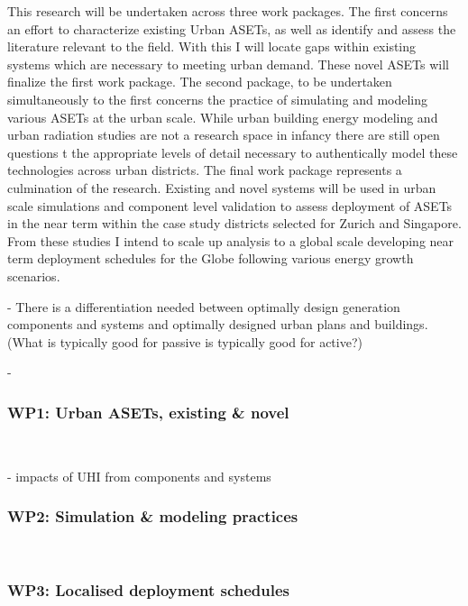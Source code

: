 This research will be undertaken across three work packages. The first concerns an effort to characterize existing Urban ASETs, as well as identify and assess the literature relevant to the field. With this I will locate gaps within existing systems which are necessary to meeting urban demand. These novel ASETs will finalize the first work package. The second package, to be undertaken simultaneously to the first concerns the practice of simulating and modeling various ASETs at the urban scale. While urban building energy modeling and urban radiation studies are not a research space in infancy there are still open questions t the appropriate levels of detail necessary to authentically model these technologies across urban districts. The final work package represents a culmination of the research. Existing and novel systems will be used in urban scale simulations and component level validation to assess deployment of ASETs in the near term within the case study districts selected for Zurich and Singapore. From these studies I intend to scale up analysis to a global scale developing near term deployment schedules for the Globe following various energy growth scenarios.  

- There is a differentiation needed between optimally design generation components and systems and optimally designed urban plans and buildings. (What is typically good for passive is typically good for active?)

- 

\subsubsection{WP1: Urban ASETs, existing \& novel}\

- impacts of UHI from components and systems
\vspace{2cm}


\subsubsection{WP2: Simulation \& modeling practices}\

\vspace{2cm}

\subsubsection{WP3: Localised deployment schedules}\

\vspace{2cm}




